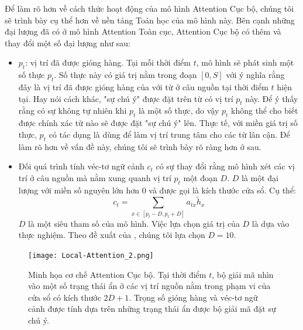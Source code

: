 Để làm rõ hơn về cách thức hoạt động của mô hình Attention Cục bộ, chúng tôi sẽ trình bày cụ thể hơn về nền tảng Toán học của mô hình này. Bên cạnh những đại lượng đã có ở mô hình Attention Toàn cục, Attention Cục bộ có thêm và thay đổi một số đại lượng như sau:
\begin{itemize}
	\item $p_t$: vị trí đã được gióng hàng. Tại mỗi thời điểm $t$, mô hình sẽ phát sinh một số thực $p_t$. Số thực này có giá trị nằm trong đoạn $[0, S]$ với ý nghĩa rằng đây là vị trí đã được gióng hàng của với từ ở câu nguồn tại thời điểm $t$ hiện tại. Hay nói cách khác, "sự chú ý" được đặt trên từ có vị trí $p_t$ này. Để ý thấy rằng có sự không tự nhiên khi $p_t$ là một số thực, do vậy $p_t$ không thể cho biết được chính xác từ nào sẽ được đặt "sự chú ý" lên. Thực tế, với miền giá trị số thực, $p_t$ có tác dụng là dùng để làm vị trí trung tâm cho các từ lân cận. Để làm rõ hơn về vấn đề này, chúng tôi sẽ trình bày rõ ràng hơn ở sau.
	\item Đối quá trình tính véc-tơ ngữ cảnh $c_t$ có sự thay đổi rằng mô hình xét các vị trí ở câu nguồn mà nằm xung quanh vị trí $p_t$ một đoạn $D$. $D$ là một đại lượng với miền số nguyên lớn hơn 0 và được gọi là kích thước cửa sổ. Cụ thể:
	\begin{equation}
	c_t = \sum_{x \in [p_t - D, p_t + D]} a_{tx}\tilde{h}_x
	\end{equation}
	$D$ là một siêu tham số của mô hình. Việc lựa chọn giá trị của $D$ là dựa vào thực nghiệm. Theo đề xuất của \cite{attentionThangLuong2015}, chúng tôi lựa chọn $D = 10$.
\end{itemize}

\begin{figure}
	\centering
	\texttt{[image: Local-Attention\_2.png]}
	\caption[Minh họa cơ chế Attention Cục bộ.]{Minh họa cơ chế Attention Cục bộ. Tại thời điểm $t$, bộ giải mã nhìn vào một số trạng thái ẩn ở các vị trí nguồn nằm trong phạm vi của cửa sổ có kích thước $2D + 1$. Trọng số gióng hàng và véc-tơ ngữ cảnh được tính dựa trên những trạng thái ẩn được bộ giải mã đặt sự chú ý.}
	\label{fig_Local_Attention}
\end{figure}

